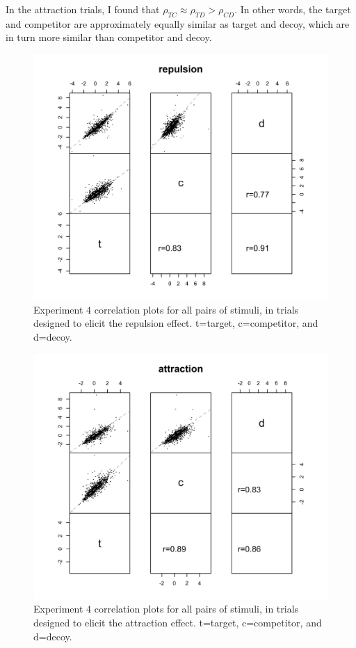In the attraction trials, I found that $\rho_{TC}\approx\rho_{TD}>\rho_{CD}$. In other words, the target and competitor are approximately equally similar as target and decoy, which are in turn more similar than competitor and decoy. 

\begin{figure}
    \includegraphics[scale=.5,width=120mm]{figures/price_z_corplot_repulsion.jpeg}
    \caption{Experiment 4 correlation plots for all pairs of stimuli, in trials designed to elicit the repulsion effect. t=target, c=competitor, and d=decoy.}
    \label{fig:price_z_corplot_repulsion}
\end{figure}

\begin{figure}
    \includegraphics[scale=.5,width=120mm]{figures/price_z_corplot_attraction.jpeg}
    \caption{Experiment 4 correlation plots for all pairs of stimuli, in trials designed to elicit the attraction effect. t=target, c=competitor, and d=decoy.}
    \label{fig:price_z_corplot_attraction}
\end{figure}

